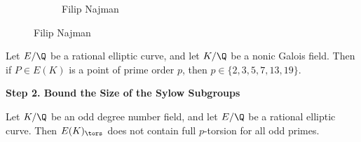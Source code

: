 \begin{frame}[plain]
\begin{figure}[h]
\begin{subfigure}{0.3\textwidth}
	\caption{Filip Najman}
	\end{subfigure}
	\end{figure}
\end{frame}



\begin{frame}[plain]
\begin{prop}
Let $E/\Q$ be a rational elliptic curve, and let $K/\Q$ be a nonic Galois field. Then if $P \in E(K)$ is a point of prime order $p$, then $p \in \{2,3,5,7,13,19\}$.
\end{prop}
\end{frame}



\begin{frame}[plain]
\vfill
\begin{center} {\bfseries \Large \textcolor{UniGray}{Step 2. Bound the Size of the Sylow Subgroups}} \end{center}
\vfill 
\end{frame}



\begin{frame}[plain]
\begin{lem}
Let $K/\Q$ be an odd degree number field, and let $E/\Q$ be a rational elliptic curve. Then $E(K)_\tors$ does not contain full $p$-torsion for all odd primes.
\end{lem}
\end{frame}



